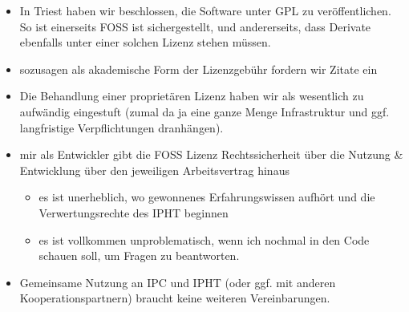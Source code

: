 \documentclass[11pt]{article}
\begin{document}
\begin{itemize}
\item In Triest haben wir beschlossen, die Software unter GPL zu veröffentlichen. So ist einerseits FOSS
  ist sichergestellt, und andererseits, dass Derivate ebenfalls unter einer solchen Lizenz stehen
  müssen.
\item sozusagen als akademische Form der Lizenzgebühr fordern wir Zitate ein
\item Die Behandlung einer proprietären Lizenz haben wir als wesentlich zu aufwändig eingestuft (zumal da
  ja eine ganze Menge Infrastruktur und ggf. langfristige Verpflichtungen dranhängen).
\item mir als Entwickler gibt die FOSS Lizenz Rechtssicherheit über die Nutzung \& Entwicklung über den jeweiligen Arbeitsvertrag hinaus
\begin{itemize}
\item es ist unerheblich, wo gewonnenes Erfahrungswissen aufhört und die Verwertungsrechte des IPHT beginnen
\item es ist vollkommen unproblematisch, wenn ich nochmal in den Code schauen soll, um Fragen zu beantworten.
\end{itemize}
\item Gemeinsame Nutzung an IPC und IPHT (oder ggf. mit anderen Kooperationspartnern) braucht keine weiteren Vereinbarungen.
\end{itemize}
\end{document}

